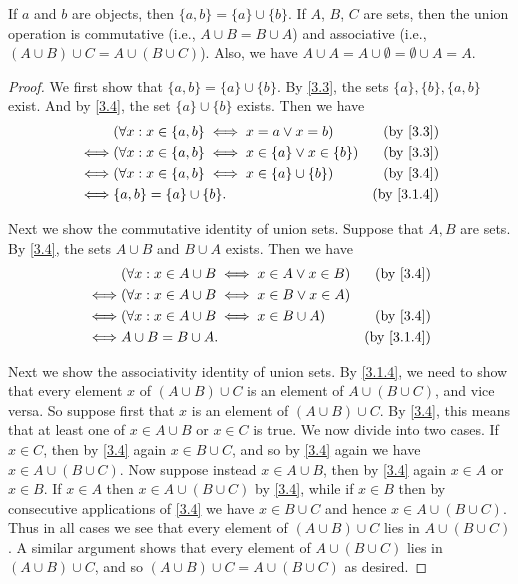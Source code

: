 \begin{lem}\label{3.1.13}
  If \(a\) and \(b\) are objects, then \(\{a, b\} = \{a\} \cup \{b\}\).
  If \(A\), \(B\), \(C\) are sets, then the union operation is commutative (i.e., \(A \cup B = B \cup A\)) and associative (i.e., \((A \cup B) \cup C = A \cup (B \cup C)\)).
  Also, we have \(A \cup A = A \cup \emptyset = \emptyset \cup A = A\).
\end{lem}

\begin{proof}
  We first show that \(\{a, b\} = \{a\} \cup \{b\}\).
  By \cref{3.3}, the sets \(\{a\}, \{b\}, \{a, b\}\) exist.
  And by \cref{3.4}, the set \(\{a\} \cup \{b\}\) exists.
  Then we have
  \begin{align*}
         & (\forall x : x \in \{a, b\} \iff x = a \lor x = b)             & \text{(by \cref{3.3})}   \\
    \iff & (\forall x : x \in \{a, b\} \iff x \in \{a\} \lor x \in \{b\}) & \text{(by \cref{3.3})}   \\
    \iff & (\forall x : x \in \{a, b\} \iff x \in \{a\} \cup \{b\})       & \text{(by \cref{3.4})}   \\
    \iff & \{a, b\} = \{a\} \cup \{b\}.                                   & \text{(by \cref{3.1.4})}
  \end{align*}

  Next we show the commutative identity of union sets.
  Suppose that \(A, B\) are sets.
  By \cref{3.4}, the sets \(A \cup B\) and \(B \cup A\) exists.
  Then we have
  \begin{align*}
         & (\forall x : x \in A \cup B \iff x \in A \lor x \in B) & \text{(by \cref{3.4})}   \\
    \iff & (\forall x : x \in A \cup B \iff x \in B \lor x \in A)                            \\
    \iff & (\forall x : x \in A \cup B \iff x \in B \cup A)       & \text{(by \cref{3.4})}   \\
    \iff & A \cup B = B \cup A.                                   & \text{(by \cref{3.1.4})}
  \end{align*}

  Next we show the associativity identity of union sets.
  By \cref{3.1.4}, we need to show that every element \(x\) of \((A \cup B) \cup C\) is an element of \(A \cup (B \cup C)\), and vice versa.
  So suppose first that \(x\) is an element of \((A \cup B) \cup C\).
  By \cref{3.4}, this means that at least one of \(x \in A \cup B\) or \(x \in C\) is true.
  We now divide into two cases.
  If \(x \in C\), then by \cref{3.4} again \(x \in B \cup C\), and so by \cref{3.4} again we have \(x \in A \cup (B \cup C)\).
  Now suppose instead \(x \in A \cup B\), then by \cref{3.4} again \(x \in A\) or \(x \in B\).
  If \(x \in A\) then \(x \in A \cup (B \cup C)\) by \cref{3.4}, while if \(x \in B\) then by consecutive applications of \cref{3.4} we have \(x \in B \cup C\) and hence \(x \in A \cup (B \cup C)\).
  Thus in all cases we see that every element of \((A \cup B) \cup C\) lies in \(A \cup (B \cup C)\).
  A similar argument shows that every element of \(A \cup (B \cup C)\) lies in \((A \cup B) \cup C\), and so \((A \cup B) \cup C = A \cup (B \cup C) \) as desired.


\end{proof}
